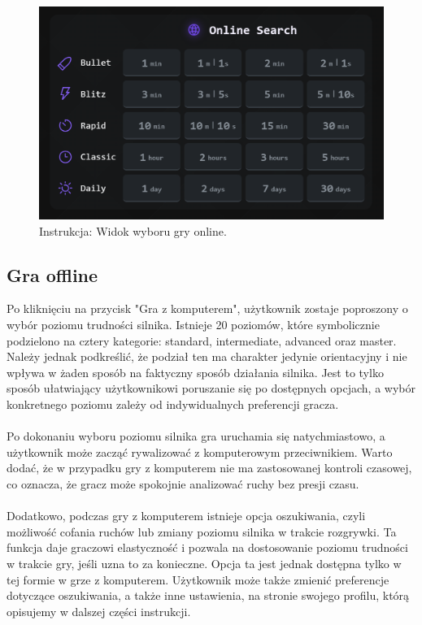 \documentclass[12pt,a4paper]{article}
\begin{document}
\vspace{0.5cm}
\begin{figure}[h!]
    \centering
    \includegraphics[width=1\textwidth]{images/ins_min_pvp.png}
    \caption{Instrukcja: Widok wyboru gry online.}
\end{figure}

\newpage

\subsection{Gra offline}

\noindent
Po kliknięciu na przycisk "Gra z komputerem", użytkownik zostaje poproszony o wybór poziomu trudności silnika. Istnieje 20 poziomów, które symbolicznie podzielono na cztery kategorie: standard, intermediate, advanced oraz master. Należy jednak podkreślić, że podział ten ma charakter jedynie orientacyjny i nie wpływa w żaden sposób na faktyczny sposób działania silnika. Jest to tylko sposób ułatwiający użytkownikowi poruszanie się po dostępnych opcjach, a wybór konkretnego poziomu zależy od indywidualnych preferencji gracza.
\\\\
Po dokonaniu wyboru poziomu silnika gra uruchamia się natychmiastowo, a użytkownik może zacząć rywalizować z komputerowym przeciwnikiem. Warto dodać, że w przypadku gry z komputerem nie ma zastosowanej kontroli czasowej, co oznacza, że gracz może spokojnie analizować ruchy bez presji czasu.
\\\\
Dodatkowo, podczas gry z komputerem istnieje opcja oszukiwania, czyli możliwość cofania ruchów lub zmiany poziomu silnika w trakcie rozgrywki. Ta funkcja daje graczowi elastyczność i pozwala na dostosowanie poziomu trudności w trakcie gry, jeśli uzna to za konieczne. Opcja ta jest jednak dostępna tylko w tej formie w grze z komputerem. Użytkownik może także zmienić preferencje dotyczące oszukiwania, a także inne ustawienia, na stronie swojego profilu, którą opisujemy w dalszej części instrukcji.
\end{document}
